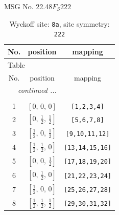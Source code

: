 \documentclass[fleqn,8pt]{jsarticle}
\begin{document}
\setcounter{MaxMatrixCols}{32}

\renewcommand{\tablename}{Table~}
\renewcommand{\figurename}{Figure~}
\begin{center}
\LARGE
MSG No. 22.48\quad$F_{S}222$
\end{center}
\renewcommand{\arraystretch}{1.2}
\begin{longtable}{ccc}
\caption{Wyckoff site: {\tt 8a}, site symmetry: {\tt 222}}
 \\
 \hline \hline
No. & position & mapping \\ \hline \endfirsthead

\multicolumn{2}{l}{\tablename\ \thetable{}} \\
 \hline \hline
No. & position & mapping \\ \hline \endhead

 \hline \hline
\multicolumn{2}{r}{\footnotesize\it continued ...} \\ \endfoot

 \hline \hline
\multicolumn{2}{r}{} \\ \endlastfoot

1 & $\left[ 0,\, 0,\, 0 \right]$ & {\tt [1,2,3,4]} \\ \hline
2 & $\left[ 0,\, \frac{1}{2},\, \frac{1}{2} \right]$ & {\tt [5,6,7,8]} \\ \hline
3 & $\left[ \frac{1}{2},\, 0,\, \frac{1}{2} \right]$ & {\tt [9,10,11,12]} \\ \hline
4 & $\left[ \frac{1}{2},\, \frac{1}{2},\, 0 \right]$ & {\tt [13,14,15,16]} \\ \hline
5 & $\left[ 0,\, 0,\, \frac{1}{2} \right]$ & {\tt [17,18,19,20]} \\ \hline
6 & $\left[ 0,\, \frac{1}{2},\, 0 \right]$ & {\tt [21,22,23,24]} \\ \hline
7 & $\left[ \frac{1}{2},\, 0,\, 0 \right]$ & {\tt [25,26,27,28]} \\ \hline
8 & $\left[ \frac{1}{2},\, \frac{1}{2},\, \frac{1}{2} \right]$ & {\tt [29,30,31,32]} \\
\end{longtable}
\renewcommand{\arraystretch}{1.2}
\end{document}
